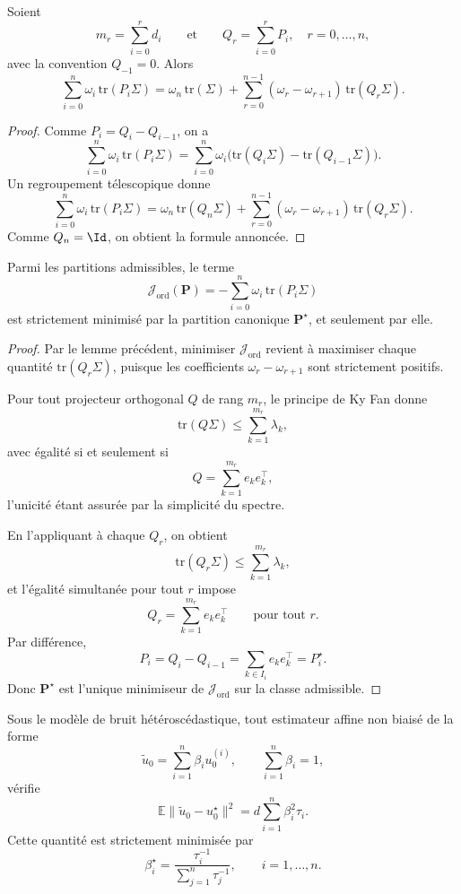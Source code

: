 \begin{lemma}
Soient
\[
m_r=\sum_{i=0}^r d_i
\qquad\text{et}\qquad
Q_r=\sum_{i=0}^r P_i,
\quad r=0,\dots,n,
\]
avec la convention \(Q_{-1}=0\).
Alors
\[
\sum_{i=0}^n \omega_i\,\mathrm{tr}(P_i\Sigma)
=
\omega_n\,\mathrm{tr}(\Sigma)
+
\sum_{r=0}^{n-1}(\omega_r-\omega_{r+1})\,\mathrm{tr}(Q_r\Sigma).
\]
\end{lemma}

\begin{proof}
Comme \(P_i=Q_i-Q_{i-1}\), on a
\[
\sum_{i=0}^n \omega_i\,\mathrm{tr}(P_i\Sigma)
=
\sum_{i=0}^n \omega_i\bigl(\mathrm{tr}(Q_i\Sigma)-\mathrm{tr}(Q_{i-1}\Sigma)\bigr).
\]
Un regroupement télescopique donne
\[
\sum_{i=0}^n \omega_i\,\mathrm{tr}(P_i\Sigma)
=
\omega_n\,\mathrm{tr}(Q_n\Sigma)
+
\sum_{r=0}^{n-1}(\omega_r-\omega_{r+1})\,\mathrm{tr}(Q_r\Sigma).
\]
Comme \(Q_n=\Id\), on obtient la formule annoncée.
\end{proof}

\begin{lemma}
Parmi les partitions admissibles, le terme
\[
\mathcal J_{\mathrm{ord}}(\mathbf P)
=
-\sum_{i=0}^n \omega_i\,\mathrm{tr}(P_i\Sigma)
\]
est strictement minimisé par la partition canonique \(\mathbf P^\star\), et seulement par elle.
\end{lemma}

\begin{proof}
Par le lemme précédent, minimiser \(\mathcal J_{\mathrm{ord}}\) revient à maximiser chaque quantité \(\mathrm{tr}(Q_r\Sigma)\), puisque les coefficients \(\omega_r-\omega_{r+1}\) sont strictement positifs.

Pour tout projecteur orthogonal \(Q\) de rang \(m_r\), le principe de Ky Fan donne
\[
\mathrm{tr}(Q\Sigma)\le \sum_{k=1}^{m_r}\lambda_k,
\]
avec égalité si et seulement si
\[
Q=\sum_{k=1}^{m_r} e_k e_k^\top,
\]
l'unicité étant assurée par la simplicité du spectre.

En l'appliquant à chaque \(Q_r\), on obtient
\[
\mathrm{tr}(Q_r\Sigma)\le \sum_{k=1}^{m_r}\lambda_k,
\]
et l'égalité simultanée pour tout \(r\) impose
\[
Q_r=\sum_{k=1}^{m_r} e_k e_k^\top
\qquad\text{pour tout } r.
\]
Par différence,
\[
P_i=Q_i-Q_{i-1}
=
\sum_{k\in I_i} e_k e_k^\top
=
P_i^\star.
\]
Donc \(\mathbf P^\star\) est l'unique minimiseur de \(\mathcal J_{\mathrm{ord}}\) sur la classe admissible.
\end{proof}

\begin{proposition}
Sous le modèle de bruit hétéroscédastique, tout estimateur affine non biaisé de la forme
\[
\tilde u_0=\sum_{i=1}^n \beta_i u_0^{(i)},
\qquad
\sum_{i=1}^n \beta_i=1,
\]
vérifie
\[
\mathbb E\|\tilde u_0-u_0^\star\|^2
=
d\sum_{i=1}^n \beta_i^2\tau_i.
\]
Cette quantité est strictement minimisée par
\[
\beta_i^\star
=
\frac{\tau_i^{-1}}{\sum_{j=1}^n\tau_j^{-1}},
\qquad i=1,\dots,n.
\]
\end{proposition}

